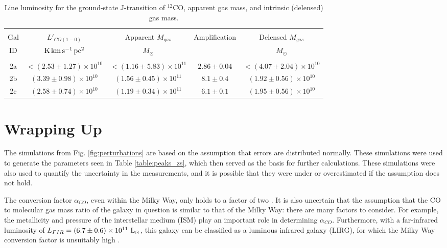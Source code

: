 \documentclass[11pt]{article}
\begin{document}
\begin{table}[!htbp]
\centering
\begin{tabular}{ccccc}
\hline \\[-0.25cm]
Gal & $L'_{CO(1-0)}$             & Apparent $M_{gas}$ & Amplification & Delensed $M_{gas}$ \\
ID  & $\rm{K\,km\,s^{-1}\,pc^2}$ & $M_\odot$          &               & $M_\odot$          \\[0.1cm]
\hline \\[-0.25cm]
2a & $<(2.53 \pm 1.27)\times 10^{10}$ & $<(1.16 \pm 5.83)\times 10^{11}$ & $2.86 \pm 0.04$ & $<(4.07 \pm 2.04)\times 10^{10}$ \\
2b & $(3.39 \pm 0.98)\times 10^{10}$  & $(1.56 \pm 0.45)\times 10^{11}$  & $8.1 \pm 0.4$   & $(1.92 \pm 0.56)\times 10^{10}$  \\
2c & $(2.58 \pm 0.74)\times 10^{10}$  & $(1.19 \pm 0.34)\times 10^{11}$  & $6.1 \pm 0.1$   & $(1.95 \pm 0.56)\times 10^{10}$  \\
\hline
\end{tabular}
\caption{Line luminosity for the ground-state J-transition of $^{12}$CO, apparent gas mass, and intrinsic (delensed) gas mass.}
\label{table:gas_mass}
\end{table}



\section*{Wrapping Up}

The simulations from Fig. \ref{fig:perturbations} are based on the assumption that errors are distributed normally. These simulations were used to generate the parameters seen in Table \ref{table:peaks_zs}, which then served as the basis for further calculations. These simulations were also used to quantify the uncertainty in the measurements, and it is possible that they were under or overestimated if the assumption does not hold. 

The conversion factor $\alpha_{CO}$, even within the Milky Way, only holds to a factor of two \citep{Carilli2013}. It is also uncertain that the assumption that the CO to molecular gas mass ratio of the galaxy in question is similar to that of the Milky Way: there are many factors to consider. For example, the metallicity and pressure of the interstellar medium (ISM) play an important role in determining $\alpha_{CO}$. Furthermore, with a far-infrared luminosity of $L_{FIR} = (6.7 \pm 0.6)\times 10^{11}~{\rm L_\odot}$, this galaxy can be classified as a luminous infrared galaxy (LIRG), for which the Milky Way conversion factor is unsuitably high \citep{Carilli2013}. 
\end{document}
